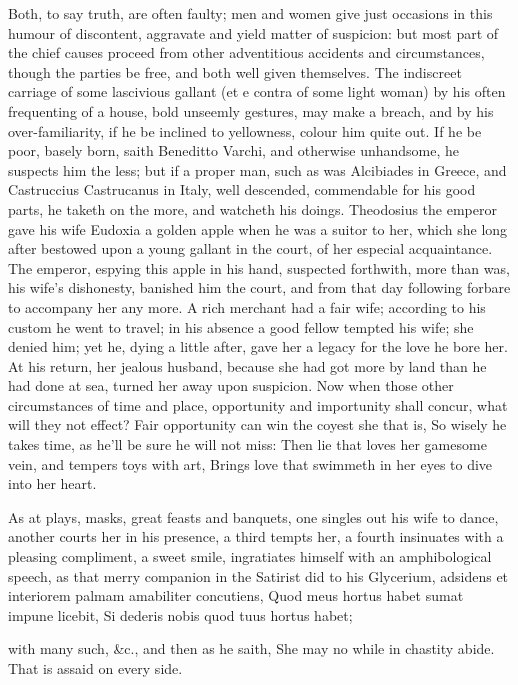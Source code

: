 {Both, to say truth, are often faulty; men and women give just occasions
in this humour of discontent, aggravate and yield matter of suspicion:
but most part of the chief causes proceed from other adventitious
accidents and circumstances, though the parties be free, and both well
given themselves. The indiscreet carriage of some lascivious gallant
(et e contra of some light woman) by his often frequenting of a house,
bold unseemly gestures, may make a breach, and by his over-familiarity,
if he be inclined to yellowness, colour him quite out. If he be poor,
basely born, saith Beneditto Varchi, and otherwise unhandsome, he
suspects him the less; but if a proper man, such as was Alcibiades in
Greece, and Castruccius Castrucanus in Italy, well descended,
commendable for his good parts, he taketh on the more, and watcheth his
doings. Theodosius the emperor gave his wife Eudoxia a golden
apple when he was a suitor to her, which she long after bestowed upon a
young gallant in the court, of her especial acquaintance. The emperor,
espying this apple in his hand, suspected forthwith, more than was, his
wife's dishonesty, banished him the court, and from that day following
forbare to accompany her any more. A rich merchant had a fair
wife; according to his custom he went to travel; in his absence a good
fellow tempted his wife; she denied him; yet he, dying a little after,
gave her a legacy for the love he bore her. At his return, her jealous
husband, because she had got more by land than he had done at sea,
turned her away upon suspicion.
Now when those other circumstances of time and place, opportunity and
importunity shall concur, what will they not effect?
Fair opportunity can win the coyest she that is,
So wisely he takes time, as he'll be sure he will not miss:
Then lie that loves her gamesome vein, and tempers toys with art,
Brings love that swimmeth in her eyes to dive into her heart.

As at plays, masks, great feasts and banquets, one singles out his wife
to dance, another courts her in his presence, a third tempts her, a
fourth insinuates with a pleasing compliment, a sweet smile,
ingratiates himself with an amphibological speech, as that merry
companion in the  Satirist did to his Glycerium, adsidens
et interiorem palmam amabiliter concutiens,
Quod meus hortus habet sumat impune licebit,
Si dederis nobis quod tuus hortus habet;

with many such, \&c., and then as he saith,
She may no while in chastity abide.
That is assaid on every side.

}
